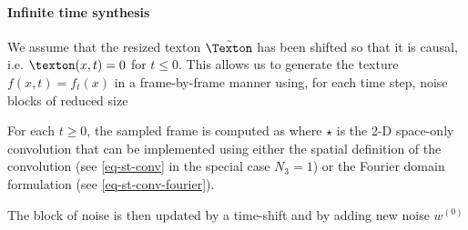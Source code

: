 \paragraph{Infinite time synthesis}

We assume that the resized texton $\tilde\Texton$ has been shifted so that it is causal, i.e. $\texton(x,t)=0$ for $t \leq 0$. This allows us to generate the texture $f(x,t)=f_t(x)$ in a frame-by-frame manner using, for each time step, noise blocks of reduced size 

For each $t \geq 0$, the sampled frame is computed as
where $\star$ is the 2-D space-only convolution that can be implemented using either the spatial definition of the convolution (see \eqref{eq-st-conv} in the special case $N_3=1$) or
the Fourier domain formulation (see \eqref{eq-st-conv-fourier}).

The block of noise is then updated by a time-shift and by adding new noise $w^{(0)}$

